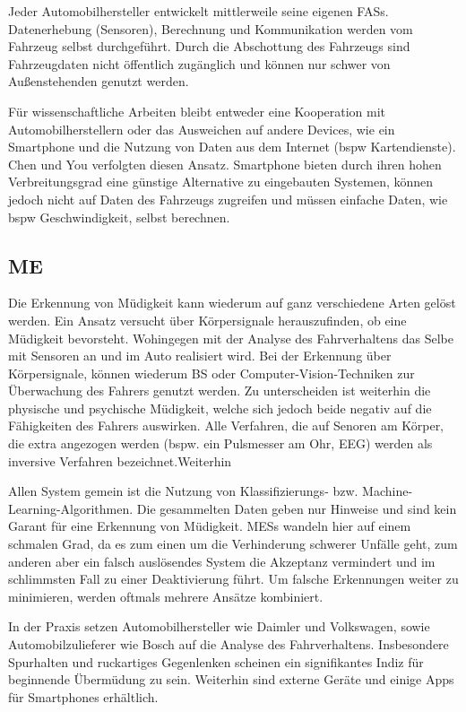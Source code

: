 {Jeder Automobilhersteller entwickelt mittlerweile seine eigenen \acl{FASs}. Datenerhebung (Sensoren), Berechnung und Kommunikation werden vom Fahrzeug selbst durchgeführt. Durch die Abschottung des Fahrzeugs sind Fahrzeugdaten nicht öffentlich zugänglich und können nur schwer von Außenstehenden genutzt werden. 

Für wissenschaftliche Arbeiten bleibt entweder eine Kooperation mit Automobilherstellern oder das Ausweichen auf andere Devices, wie ein Smartphone und die Nutzung von Daten aus dem Internet (\acl{bspw} Kartendienste). Chen \cite{Chen:2015:ISV:2742647.2742659} und You \cite{You:2013:CAA:2462456.2465428} verfolgten diesen Ansatz. Smartphone bieten durch ihren hohen Verbreitungsgrad eine günstige Alternative zu eingebauten Systemen, können jedoch nicht auf Daten des Fahrzeugs zugreifen und müssen einfache Daten, wie \acl{bspw} Geschwindigkeit, selbst berechnen.

\subsection{\acl{ME}}
Die Erkennung von Müdigkeit kann wiederum auf ganz verschiedene Arten gelöst werden. Ein Ansatz versucht über Körpersignale herauszufinden, ob eine Müdigkeit bevorsteht. Wohingegen mit der Analyse des Fahrverhaltens das Selbe mit Sensoren an und im Auto realisiert wird.
Bei der Erkennung über Körpersignale, können wiederum \acl{BS} oder Computer-Vision-Techniken zur Überwachung des Fahrers genutzt werden. Zu unterscheiden ist weiterhin die physische und psychische Müdigkeit, welche sich jedoch beide negativ auf die Fähigkeiten des Fahrers auswirken. Alle Verfahren, die auf Senoren am Körper, die extra angezogen werden (bspw. ein Pulsmesser am Ohr, EEG) werden als inversive Verfahren bezeichnet.Weiterhin 

Allen System gemein ist die Nutzung von Klassifizierungs- bzw. Machine-Learning-Algorithmen. Die gesammelten Daten geben nur Hinweise und sind kein Garant für eine Erkennung von Müdigkeit. \acl{MESs} wandeln hier auf einem schmalen Grad, da es zum einen um die Verhinderung schwerer Unfälle geht, zum anderen aber ein falsch auslösendes System die Akzeptanz vermindert und im schlimmsten Fall zu einer Deaktivierung führt. Um falsche Erkennungen weiter zu minimieren, werden oftmals mehrere Ansätze kombiniert.

In der Praxis setzen Automobilhersteller wie Daimler \cite{Daimler} und Volkswagen, sowie Automobilzulieferer wie Bosch \cite{Bosch} auf die Analyse des Fahrverhaltens. Insbesondere Spurhalten und ruckartiges Gegenlenken scheinen ein signifikantes Indiz für beginnende Übermüdung zu sein. Weiterhin sind externe Geräte und einige Apps für Smartphones erhältlich.

}

